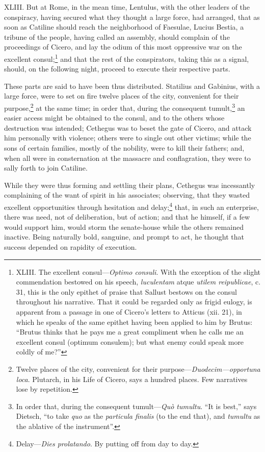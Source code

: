 XLIII. But at Rome, in the mean time, Lentulus, with the other leaders
of the conspiracy, having secured what they thought a large force, had
arranged, that as soon as Catiline should reach the neighborhood of
Faesulae, Lucius Bestia, a tribune of the people, having called an
assembly, should complain of the proceedings of Cicero, and lay the
odium of this most oppressive war on the excellent consul;\footnote{XLIII. The excellent consul—\emph{Optimo consuli}. With the
exception of the slight commendation bestowed on his speech,
\emph{luculentam} atque \emph{utilem reipublicae}, c. 31, this is the only
epithet of praise that Sallust bestows on the consul throughout his
narrative. That it could be regarded only as frigid eulogy, is
apparent from a passage in one of Cicero's letters to Atticus (xii.
21), in which he speaks of the same epithet having been applied to him
by Brutus: ``Brutus thinks that he pays me a great compliment when he
calls me an excellent consul (optimum consulem); but what enemy could
speak more coldly of me?''} and
that the rest of the conspirators, taking this as a signal, should, on
the following night, proceed to execute their respective parts.

These parts are said to have been thus distributed. Statilius and
Gabinius, with a large force, were to set on fire twelve places of the
city, convenient for their purpose,\footnote{Twelve places of the city, convenient for their purpose—\emph{Duodecim—opportuna loca}. Plutarch, in his Life of Cicero, says a
hundred places. Few narratives lose by repetition.} at the same time; in order
that, during the consequent tumult,\footnote{In order that, during the consequent tumult—\emph{Quò tumultu}.
``It is best,'' says Dietsch, ``to take \emph{quo} as the \emph{particula finalis}
(to the end that), and \emph{tumultu} as the ablative of the instrument''.} an easier access might be
obtained to the consul, and to the others whose destruction was
intended; Cethegus was to beset the gate of Cicero, and attack him
personally with violence; others were to single out other victims;
while the sons of certain families, mostly of the nobility, were to
kill their fathers; and, when all were in consternation at the
massacre and conflagration, they were to sally forth to join Catiline.

While they were thus forming and settling their plans, Cethegus was
incessantly complaining of the want of spirit in his associates;
observing, that they wasted excellent opportunities through hesitation
and delay;\footnote{Delay—\emph{Dies prolatando}. By putting off from day to day.} that, in such an enterprise, there was need, not of
deliberation, but of action; and that he himself, if a few would
support him, would storm the senate-house while the others remained
inactive. Being naturally bold, sanguine, and prompt to act, he
thought that success depended on rapidity of execution.

